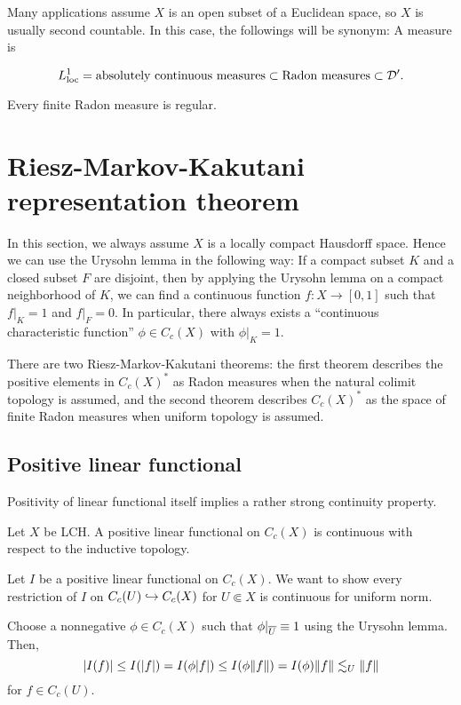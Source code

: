 \documentclass{../exp}
\begin{document}
Many applications assume $X$ is an open subset of a Euclidean space, so $X$ is usually second countable.
In this case, the followings will be synonym: A measure is
\begin{cond}
\item 
\end{cond}



\[L_{\text{loc}}^1=\text{absolutely continuous measures}\subset\text{Radon measures}\subset\mathcal{D}'.\]


\begin{thm}
Every finite Radon measure is regular.
\end{thm}







\section{Riesz-Markov-Kakutani representation theorem}
In this section, we always assume $X$ is a locally compact Hausdorff space.
Hence we can use the Urysohn lemma in the following way: If a compact subset $K$ and a closed subset $F$ are disjoint, then by applying the Urysohn lemma on a compact neighborhood of $K$, we can find a continuous function $f:X\to[0,1]$ such that $f|_K=1$ and $f|_F=0$.
In particular, there always exists a ``continuous characteristic function'' $\phi\in C_c(X)$ with $\phi|_K=1$.

There are two Riesz-Markov-Kakutani theorems: the first theorem describes the positive elements in $C_c(X)^*$ as Radon measures when the natural colimit topology is assumed, and the second theorem describes $C_c(X)^*$ as the space of finite Radon measures when uniform topology is assumed.

\subsection{Positive linear functional}
Positivity of linear functional itself implies a rather strong continuity property.
\begin{thm}
Let $X$ be LCH.
A positive linear functional on $C_c(X)$ is continuous with respect to the inductive topology.
\end{thm}
\begin{pf}
Let $I$ be a positive linear functional on $C_c(X)$.
We want to show every restriction of $I$ on $C_c(U)\hookrightarrow C_c(X)$ for $U\Subset X$ is continuous for uniform norm.

Choose a nonnegative $\phi\in C_c(X)$ such that $\phi|_{\overline{U}}\equiv1$ using the Urysohn lemma.
Then,
\[|I(f)|\le I(|f|)=I(\phi|f|)\le I(\phi\|f\|)=I(\phi)\|f\|\lesssim_U\|f\|\]
for $f\in C_c(U)$.
\end{pf}
\end{document}
